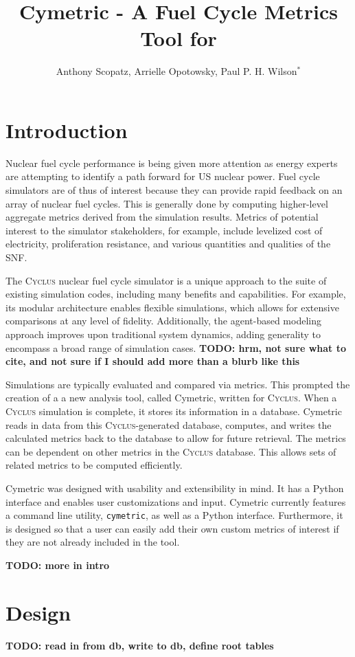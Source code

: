 \documentclass{anstrans}
\title{Cymetric - A Fuel Cycle Metrics Tool for \cyclus}
\author{Anthony Scopatz, Arrielle Opotowsky, Paul P. H. Wilson$^{*}$}
\institute{
$^{*}$Department of Engineering Physics, University of Wisconsin - Madison, 
1500 Engineering Drive, Madison WI 53703
}
\newcommand{\cyclus}{\textsc{Cyclus}\xspace}
\newcommand{\TODO}[1] {{\color{red}\textbf{TODO: #1}}}
\newcommand{\code}[1]{{\color{code}\texttt{#1}}}
\begin{document}
\section{Introduction}
Nuclear fuel cycle performance is being given more attention as energy 
experts are attempting to identify a path forward for \gls{US} nuclear power. 
Fuel cycle simulators are of thus of interest because they can provide rapid 
feedback on an array of nuclear fuel cycles. This is generally done by 
computing higher-level aggregate metrics derived from the simulation results. 
Metrics of potential interest to the simulator stakeholders, for example, 
include levelized cost of electricity, proliferation resistance, and various 
quantities and qualities of the \gls{SNF}.

The \cyclus nuclear fuel cycle simulator is a unique approach to the suite of 
existing simulation codes, including many benefits and capabilities.
For example, its modular architecture enables flexible simulations, which allows for extensive 
comparisons at any level of fidelity. Additionally, the agent-based modeling approach improves upon 
traditional system dynamics, adding generality to encompass a broad range of simulation cases. 
\TODO{hrm, not sure what to cite, and not sure if I should add more than a blurb like this}

Simulations are typically evaluated and compared via metrics. This 
prompted the creation of a
a new analysis tool, called Cymetric, written for \cyclus. When a \cyclus 
simulation is complete, it stores its information in a database. Cymetric 
reads in data from this \cyclus{}-generated database, computes, and writes 
the calculated metrics back to the database to allow for future retrieval. 
The metrics can be dependent on other metrics in the \cyclus database.
This allows sets of related metrics to be computed efficiently.

Cymetric was designed with usability and extensibility in mind. 
It has a Python interface and enables user customizations and input. 
Cymetric currently features a command line utility, \code{cymetric}, 
as well as a Python interface. Furthermore, it is designed so that a user can 
easily add their own custom metrics of interest if they are not already 
included in the tool. 

\TODO{more in intro}

\section{Design}
\TODO{ read in from db, write to db, define root tables}
\end{document}
